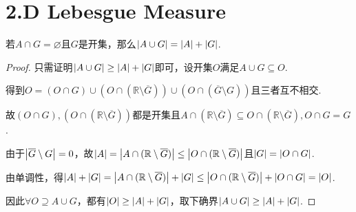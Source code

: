 \section{2.D Lebesgue Measure}

\begin{theorem}[2.62]\label{2.62}
    若\(A \cap G=\varnothing\)且\(G\)是开集，那么\(\abs*{A \cup G}=\abs*{A}+\abs*{G}\).
\end{theorem}

\begin{proof}
    只需证明\(\abs*{A \cup G} \geq \abs*{A}+\abs*{G}\)即可，设开集\(O\)满足\(A \cup G \subseteq O\).
    
    得到\(O=(O \cap G) \cup (O \cap (\mathbb{R} \setminus \overline{G})) \cup (O \cap (\overline{G} \setminus G))\)且{\kaishu 三者互不相交}.

    故\((O \cap G), (O \cap (\mathbb{R} \setminus \overline{G}))\)都是开集且\(A \cap (\mathbb{R} \setminus \overline{G}) \subseteq O \cap (\mathbb{R} \setminus \overline{G}), O \cap G=G\).

    由于\(\abs*{\overline{G} \setminus G}=0\)，故\(\abs*{A}=\abs*{A \cap (\mathbb{R} \setminus \overline{G})} \leq \abs*{O \cap (\mathbb{R} \setminus \overline{G})}\)且\(\abs*{G}=\abs*{O \cap G}\).

    由单调性，得\(\abs*{A}+\abs*{G}=\abs*{A \cap (\mathbb{R} \setminus \overline{G})}+\abs*{G} \leq \abs*{O \cap (\mathbb{R} \setminus \overline{G})}+\abs*{O \cap G}=\abs*{O}\).

    因此\(\forall O \supseteq A \cup G\)，都有\(\abs*{O} \geq \abs*{A}+\abs*{G}\)，取下确界\(\abs*{A \cup G} \geq \abs*{A}+\abs*{G}\).
\end{proof}

